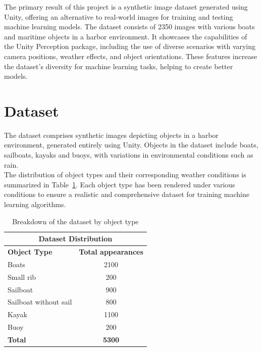 The primary result of this project is a synthetic image dataset generated using Unity, offering an alternative to real-world images for training and testing machine learning models. The dataset consists of 2350 images with various boats and maritime objects in a harbor environment. It showcases the capabilities of the Unity Perception package, including the use of diverse scenarios with varying camera positions, weather effects, and object orientations. These features increase the dataset's diversity for machine learning tasks, helping to create better models.

\section{Dataset}
The dataset comprises synthetic images depicting objects in a harbor environment, generated entirely using Unity. Objects in the dataset include boats, sailboats, kayaks and buoys, with variations in environmental conditions such as rain.\\

\noindent The distribution of object types and their corresponding weather conditions is summarized in Table~\ref{tab:dataset_composition}. Each object type has been rendered under various conditions to ensure a realistic and comprehensive dataset for training machine learning algorithms.
 
\begin{table}[H]
\centering
\begin{tabular}{|l|c|}
\hline
\multicolumn{2}{|c|}{\textbf{Dataset Distribution}} \\ 
\hline
\textbf{Object Type} & \textbf{Total appearances}\\ 
\hline
Boats         & 2100  \\ 
Small rib     & 200 \\
Sailboat      & 900     \\
Sailboat without sail     & 800    \\
Kayak        & 1100     \\ 
Buoy         & 200     \\ 

\hline
\textbf{Total}       & \textbf{5300} \\ 
\hline
\end{tabular}
\caption{Breakdown of the dataset by object type}
\label{tab:dataset_composition}
\end{table}



